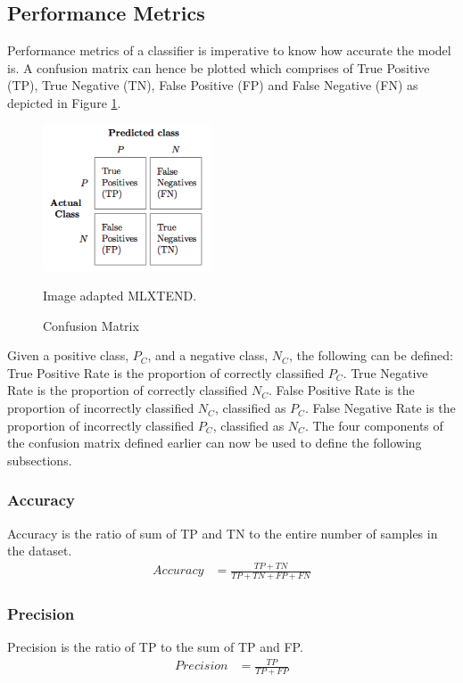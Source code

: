 \documentclass[a4paper,12pt,twoside]{report}
\begin{document}
\subsection{Performance Metrics}
Performance metrics of a classifier is imperative to know how accurate the model is. A confusion matrix can hence be plotted which comprises of True Positive (TP), True Negative (TN), False Positive (FP) and False Negative (FN) as depicted in Figure \ref{fig:confusion-matrix}.
\begin{figure}[h] %
    \centering
    \includegraphics[width=5cm]{confusion_matrix}
    \caption{Confusion Matrix}
    \small Image adapted MLXTEND\footnotemark.
    \label{fig:confusion-matrix}
\end{figure}
\newline \newline
Given a positive class, $P_C$, and a negative class, $N_C$, the following can be defined:
\newline \newline
True Positive Rate is the proportion of correctly classified $P_C$. True Negative Rate is the proportion of correctly classified $N_C$. False Positive Rate is the proportion of incorrectly classified $N_C$, classified as $P_C$. False Negative Rate is the proportion of incorrectly classified $P_C$, classified as $N_C$. The four components of the confusion matrix defined earlier can now be used to define the following subsections.

\subsubsection{Accuracy} 
Accuracy is the ratio of sum of TP and TN to the entire number of samples in the dataset.
\begin{align*}
Accuracy &= \frac{ TP + TN}{TP + TN + FP + FN}
\end{align*}

\subsubsection{Precision} 
Precision is the ratio of TP to the sum of TP and FP.
\begin{align*}
Precision &= \frac{TP}{TP + FP}
\end{align*}
\end{document}
